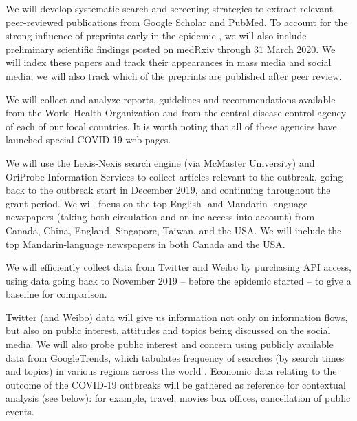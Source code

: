 



 We will develop systematic search and screening strategies to extract relevant peer-reviewed publications from Google Scholar and PubMed. To account for the strong influence of preprints early in the epidemic \cite{MajuMandPRE}, we will also include preliminary scientific findings posted on medRxiv through 31 March 2020. We will index these papers and track their appearances in mass media and social media; we will also track which of the preprints are published after peer review.

 We will collect and analyze reports, guidelines and recommendations available from the World Health Organization and from the central disease control agency of each of our focal countries. It is worth noting that all of these agencies have launched special COVID-19 web pages.


We will use the Lexis-Nexis search engine (via McMaster University) and OriProbe Information Services to collect articles relevant to the outbreak, going back to the outbreak start in December 2019, and continuing throughout the grant period. 
We will focus on the top English- and Mandarin-language newspapers (taking both circulation and online access into account) from 
Canada, China, England, Singapore, Taiwan, and the USA.
We will include the top Mandarin-language newspapers in both Canada and the USA.

We will efficiently collect data from Twitter and Weibo by purchasing API access, using data going back to November 2019 -- before the epidemic started -- to give a baseline for comparison. 

Twitter (and Weibo)  data will give us information not only on information flows, but also on public interest, attitudes and topics being discussed on the social media. We will also probe public interest and concern using publicly available data from GoogleTrends, which tabulates frequency of searches (by search times and topics) in various regions across the world \cite{BousAgac17, MahrBrag19}.
Economic data relating to the outcome of the COVID-19 outbreaks will be gathered as reference for contextual analysis (see below): for example, travel, movies box offices, cancellation of public events.

